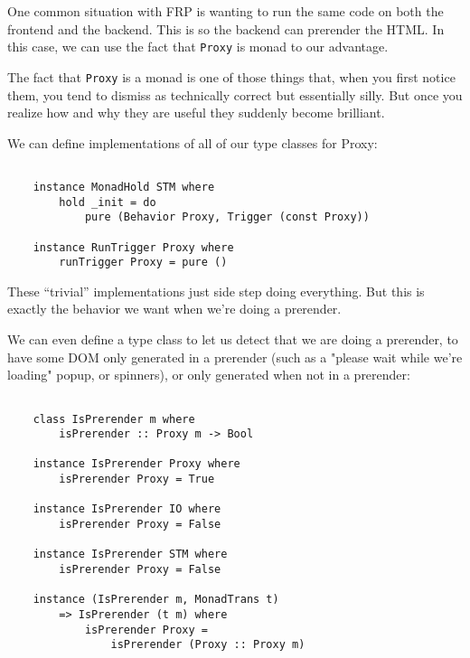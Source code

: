 \documentclass{article}
\begin{document}
One common situation with FRP is wanting to run the same code on both
the frontend and the backend.  This is so the backend can prerender
the HTML.  In this case, we can use the fact that \verb|Proxy| is monad
to our advantage.  

The fact that \verb|Proxy| is a monad is one of those things that, when
you first notice them, you tend to dismiss as technically correct but
essentially silly.  But once you realize how and why they are useful
they suddenly become brilliant.

We can define implementations of all of our type classes for Proxy:

\begin{verbatim}

    instance MonadHold STM where
        hold _init = do
            pure (Behavior Proxy, Trigger (const Proxy))

    instance RunTrigger Proxy where
        runTrigger Proxy = pure ()

\end{verbatim}

These ``trivial'' implementations just side step doing everything.  But
this is exactly the behavior we want when we're doing a prerender.

We can even define a type class to let us detect that we are doing a
prerender, to have some DOM only generated in a prerender (such as a
"please wait while we're loading" popup, or spinners), or only generated
when not in a prerender:

\begin{verbatim}

    class IsPrerender m where
        isPrerender :: Proxy m -> Bool

    instance IsPrerender Proxy where
        isPrerender Proxy = True

    instance IsPrerender IO where
        isPrerender Proxy = False

    instance IsPrerender STM where
        isPrerender Proxy = False

    instance (IsPrerender m, MonadTrans t)
        => IsPrerender (t m) where
            isPrerender Proxy =
                isPrerender (Proxy :: Proxy m)

\end{verbatim}
\end{document}
